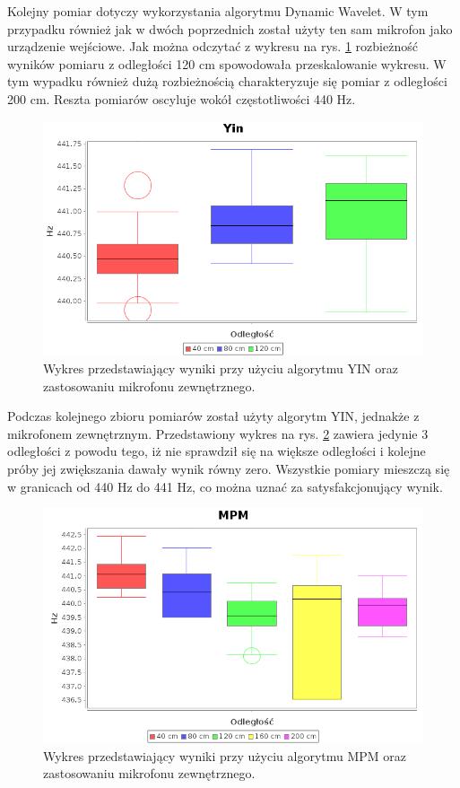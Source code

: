 Kolejny pomiar dotyczy wykorzystania algorytmu Dynamic Wavelet. W tym przypadku również jak w dwóch poprzednich został użyty ten sam mikrofon jako urządzenie wejściowe. Jak można odczytać z wykresu na rys. \ref{yinz} rozbieżność wyników pomiaru z odległości 120 cm spowodowała przeskalowanie wykresu. W tym wypadku również dużą rozbieżnością charakteryzuje się pomiar z odległości 200 cm. Reszta pomiarów oscyluje wokół częstotliwości 440 Hz.


\begin{figure}[h!]
  \centering
  \includegraphics[width=0.9\linewidth]{rys/BoxPlots/YIN_mic_zew}
  \caption{Wykres przedstawiający wyniki przy użyciu algorytmu YIN oraz zastosowaniu mikrofonu zewnętrznego.}
  \label{yinz}
\end{figure}



Podczas kolejnego zbioru pomiarów został użyty algorytm YIN, jednakże z mikrofonem zewnętrznym. Przedstawiony wykres na rys. \ref{mpmz} zawiera jedynie 3 odległości z powodu tego, iż nie sprawdził się na większe odległości i kolejne próby jej zwiększania dawały wynik równy zero. Wszystkie pomiary mieszczą się w granicach od 440 Hz do 441 Hz, co można uznać za satysfakcjonujący wynik.


\begin{figure}[h!]
  \centering
  \includegraphics[width=0.9\linewidth]{rys/BoxPlots/MPM_mic_zew}
  \caption{Wykres przedstawiający wyniki przy użyciu algorytmu MPM oraz zastosowaniu mikrofonu zewnętrznego.}
  \label{mpmz}
\end{figure}



